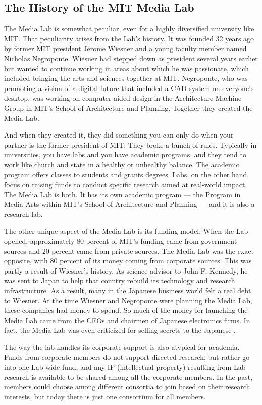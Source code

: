 \subsection{The History of the MIT Media Lab}

The Media Lab is somewhat peculiar, even for a highly diversified university like MIT. That peculiarity arises from the Lab's history. It was founded 32 years ago by former MIT president Jerome Wiesner and a young faculty member named Nicholas Negroponte. Wiesner had stepped down as president several years earlier but wanted to continue working in areas about which he was passionate, which included bringing the arts and sciences together at MIT. Negroponte, who was promoting a vision of a digital future that included a CAD system on everyone's desktop, was working on computer-aided design in the Architecture Machine Group in MIT's School of Architecture and Planning. Together they created the Media Lab.

And when they created it, they did something you can only do when your partner is the former president of MIT: They broke a bunch of rules. Typically in universities, you have labs and you have academic programs, and they tend to work like church and state in a healthy or unhealthy balance. The academic program offers classes to students and grants degrees. Labs, on the other hand, focus on raising funds to conduct specific research aimed at real-world impact. The Media Lab is both. It has its own academic program --- the Program in Media Arts within MIT's School of Architecture and Planning --- and it is also a research lab. 

The other unique aspect of the Media Lab is its funding model. When the Lab opened, approximately 80 percent of MIT's funding came from government sources and 20 percent came from private sources. The Media Lab was the exact opposite, with 80 percent of its money coming from corporate sources. This was partly a result of Wiesner's history. As science advisor to John F. Kennedy, he was sent to Japan to help that country rebuild its technology and research infrastructure. As a result, many in the Japanese business world felt a real debt to Wiesner. At the time Wiesner and Negroponte were planning the Media Lab, these companies had money to spend. So much of the money for launching the Media Lab came from the CEOs and chairmen of Japanese electronics firms. In fact, the Media Lab was even criticized for selling secrets to the Japanese \cite{MITDealW66:online}.

The way the lab handles its corporate support is also atypical for academia. Funds from corporate members do not support directed research, but rather go into one Lab-wide fund, and any IP (intellectual property) resulting from Lab research is available to be shared among all the corporate members. In the past, members could choose among different consortia to join based on their research interests, but today there is just one consortium for all members.


